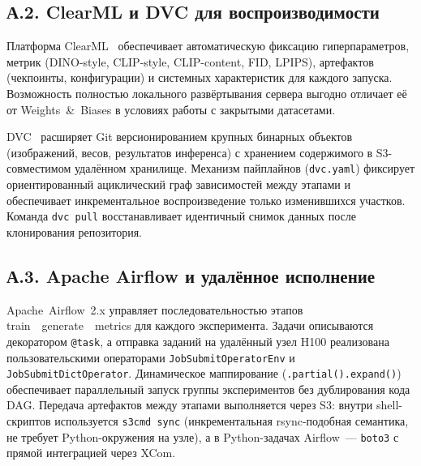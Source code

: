 \subsection*{А.2. ClearML и DVC для воспроизводимости}

Платформа ClearML~\cite{clearml2024} обеспечивает автоматическую фиксацию
гиперпараметров, метрик (DINO-style, CLIP-style, CLIP-content, FID, LPIPS),
артефактов (чекпоинты, конфигурации) и системных характеристик для каждого
запуска. Возможность полностью локального развёртывания сервера выгодно
отличает её от Weights~\&~Biases в условиях работы с закрытыми датасетами.

DVC~\cite{dvc2020} расширяет Git версионированием крупных бинарных объектов
(изображений, весов, результатов инференса) с хранением содержимого
в S3-совместимом удалённом хранилище. Механизм пайплайнов
(\texttt{dvc.yaml}) фиксирует ориентированный ациклический граф зависимостей
между этапами и обеспечивает инкрементальное воспроизведение только
изменившихся участков. Команда \texttt{dvc~pull} восстанавливает идентичный
снимок данных после клонирования репозитория.

\subsection*{А.3. Apache Airflow и удалённое исполнение}

Apache~Airflow~2.x управляет последовательностью этапов
train~\textrightarrow{}~generate~\textrightarrow{}~metrics для каждого
эксперимента. Задачи описываются декоратором \texttt{@task}, а отправка
заданий на удалённый узел H100 реализована пользовательскими операторами
\texttt{JobSubmitOperatorEnv} и \texttt{JobSubmitDictOperator}. Динамическое
маппирование (\texttt{.partial().expand()}) обеспечивает параллельный запуск
группы экспериментов без дублирования кода DAG. Передача артефактов между
этапами выполняется через S3: внутри shell-скриптов используется
\texttt{s3cmd~sync} (инкрементальная rsync-подобная семантика, не требует
Python-окружения на узле), а в Python-задачах Airflow~--- \texttt{boto3}
с прямой интеграцией через XCom.
